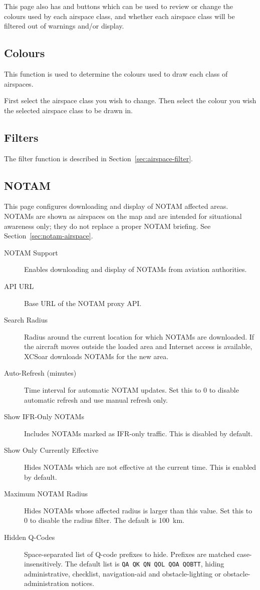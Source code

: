 This page also has  and  buttons which
can be used to review or change the colours used by each
airspace class, and whether each airspace class will be filtered out
of warnings and/or display. 

\subsection*{Colours}
This function is used to determine the colours used to draw each class of
airspaces.

First select the airspace class you wish to change. Then select the colour
you wish the selected airspace class to be drawn in.

\subsection*{Filters}
The filter function is described in Section~\ref{sec:airspace-filter}.

\subsection*{NOTAM}

This page configures downloading and display of NOTAM affected areas.
NOTAMs are shown as airspaces on the map and are intended for
situational awareness only; they do not replace a proper NOTAM briefing.
See Section~\ref{sec:notam-airspace}.

\begin{description}
\item[NOTAM Support]  Enables downloading and display of NOTAMs from
  aviation authorities.
\item[API URL]  Base URL of the NOTAM proxy API.
\item[Search Radius]  Radius around the current location for which NOTAMs
  are downloaded.  If the aircraft moves outside the loaded area and
  Internet access is available, XCSoar downloads NOTAMs for the new area.
\item[Auto-Refresh (minutes)]  Time interval for automatic NOTAM updates.
  Set this to 0 to disable automatic refresh and use manual refresh only.
\item[Show IFR-Only NOTAMs]  Includes NOTAMs marked as IFR-only traffic.
  This is disabled by default.
\item[Show Only Currently Effective]  Hides NOTAMs which are not effective
  at the current time.  This is enabled by default.
\item[Maximum NOTAM Radius]  Hides NOTAMs whose affected radius is larger
  than this value.  Set this to 0 to disable the radius filter.  The
  default is 100~km.
\item[Hidden Q-Codes]  Space-separated list of Q-code prefixes to hide.
  Prefixes are matched case-insensitively.  The default list is
  \texttt{QA QK QN QOL QOA QOBTT}, hiding administrative, checklist,
  navigation-aid and obstacle-lighting or obstacle-administration notices.
\end{description}

